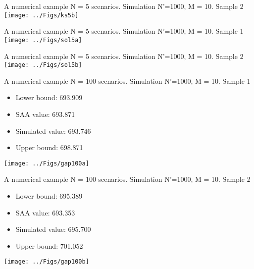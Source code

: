 \begin{frame}{A numerical example}
{N = 5 scenarios. Simulation N'=1000, M = 10. Sample 2}
\centering \texttt{[image: ../Figs/ks5b]}
\end{frame}



\begin{frame}{A numerical example}
{N = 5 scenarios. Simulation N'=1000, M = 10. Sample 1}
\centering \texttt{[image: ../Figs/sol5a]}
\end{frame}

\begin{frame}{A numerical example}
{N = 5 scenarios. Simulation N'=1000, M = 10. Sample 2}
\centering \texttt{[image: ../Figs/sol5b]}
\end{frame}

\begin{frame}{A numerical example}
{N = 100 scenarios. Simulation N'=1000, M = 10. Sample 1}

\begin{itemize}
\item Lower bound: 693.909

\item SAA value:  693.871

\item Simulated value:  693.746

\item Upper bound:  698.871
\end{itemize}

\centering \texttt{[image: ../Figs/gap100a]}
\end{frame}

\begin{frame}{A numerical example}
{N = 100 scenarios. Simulation N'=1000, M = 10. Sample 2}

\begin{itemize}
\item Lower bound: 695.389

\item SAA value:  693.353

\item Simulated value:  695.700

\item Upper bound:  701.052
\end{itemize}

\centering \texttt{[image: ../Figs/gap100b]}
\end{frame}


